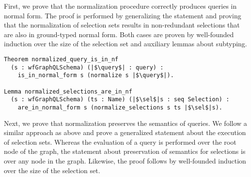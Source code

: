 First, we prove that the normalization procedure correctly produces queries in normal form. The proof is performed by generalizing the statement and proving that the normalization of selection sets results in non-redundant selections that are also in ground-typed normal form.
Both cases are proven by well-founded induction over the size of the selection set and auxiliary lemmas about subtyping. 

\begin{verbatim}
Theorem normalized_query_is_in_nf 
  (s : wfGraphQLSchema) (|$\query$| : query) :
    is_in_normal_form s (normalize s |$\query$|).
    
Lemma normalized_selections_are_in_nf
  (s : wfGraphQLSchema) (ts : Name) (|$\sel$|s : seq Selection) :
    are_in_normal_form s (normalize_selections s ts |$\sel$|s).
\end{verbatim}

Next, we prove that normalization preserves the semantics of queries. We follow a similar approach as above and prove a generalized statement about the execution of selection sets. Whereas the evaluation of a query is performed over the root node of the graph, the statement about preservation of semantics for selections is over any node in the graph. 
Likewise, the proof follows by well-founded induction over the size of the selection set.


